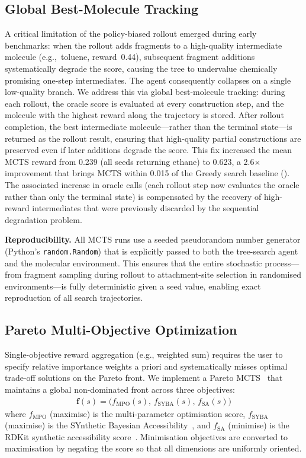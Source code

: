 \documentclass[jcim,article,layout=manuscript]{achemso}
\begin{document}
\subsection{Global Best-Molecule Tracking}
\label{sec:rollout_fix}
A critical
limitation of the policy-biased rollout emerged during early benchmarks:
when the rollout adds fragments to a high-quality intermediate molecule
(e.g.,~toluene, reward~0.44), subsequent fragment additions systematically
degrade the score, causing the tree to undervalue chemically promising
one-step intermediates. The agent consequently collapses on a single
low-quality branch. We address this via global best-molecule tracking:
during each rollout, the oracle score is evaluated at every construction
step, and the molecule with the highest reward along the trajectory is
stored. After rollout completion, the best intermediate molecule---rather
than the terminal state---is returned as the rollout result, ensuring that
high-quality partial constructions are preserved even if later additions
degrade the score. This fix increased the mean MCTS reward from 0.239
(all seeds returning ethane) to 0.623, a 2.6$\times$ improvement that
brings MCTS within 0.015 of the Greedy search baseline (). The associated
increase in oracle calls (each rollout step now evaluates the oracle
rather than only the terminal state) is compensated by the recovery of
high-reward intermediates that were previously discarded by the sequential
degradation problem.

\begin{sloppypar}
\textbf{Reproducibility.} All MCTS runs use a seeded pseudorandom number
generator (Python's \texttt{random.Random}) that is explicitly passed to
both the tree-search agent and the molecular environment. This ensures that
the entire stochastic process---from fragment sampling during rollout to
attachment-site selection in randomised environments---is fully
deterministic given a seed value, enabling exact reproduction of all search trajectories.
\end{sloppypar}

\subsection{Pareto Multi-Objective Optimization}
\label{sec:pareto}

Single-objective reward aggregation (e.g., weighted sum) requires the user
to specify relative importance weights a priori and systematically misses
optimal trade-off solutions on the Pareto front. We implement a Pareto
MCTS~\cite{Mothra2024} that maintains a global non-dominated front across
three objectives:
\begin{align}
  \mathbf{f}(s) = \bigl(f_{\text{MPO}}(s),\, f_{\text{SYBA}}(s),\, f_{\text{SA}}(s)\bigr)
  \label{eq:objectives}
\end{align}
where $f_{\text{MPO}}$ (maximise) is the multi-parameter optimisation
score, $f_{\text{SYBA}}$ (maximise) is the SYnthetic Bayesian
Accessibility~\cite{Vorsilak2020}, and $f_{\text{SA}}$ (minimise) is the
RDKit synthetic accessibility score~\cite{Ertl2009}. Minimisation objectives
are converted to maximisation by negating the score so that all dimensions
are uniformly oriented.
\end{document}
